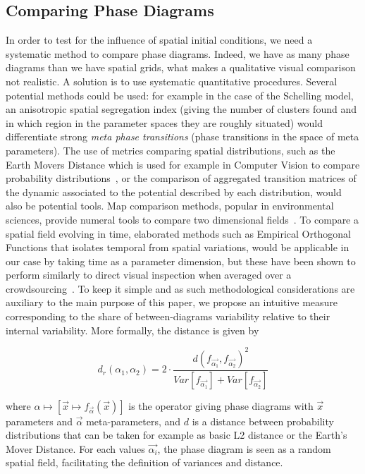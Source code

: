 \documentclass[Afour,sageh,times]{sagej}
\begin{document}


\subsection{Comparing Phase Diagrams}

In order to test for the influence of spatial initial conditions, we need a systematic method to compare phase diagrams. Indeed, we have as many phase diagrams than we have spatial grids, what makes a qualitative visual comparison not realistic. A solution is to use systematic quantitative procedures. Several potential methods could be used: for example in the case of the Schelling model, an anisotropic spatial segregation index (giving the number of clusters found and in which region in the parameter spaces they are roughly situated) would differentiate strong \emph{meta phase transitions} (phase transitions in the space of meta parameters). The use of metrics comparing spatial distributions, such as the Earth Movers Distance which is used for example in Computer Vision to compare probability distributions~\cite{rubner2000earth}, or the comparison of aggregated transition matrices of the dynamic associated to the potential described by each distribution, would also be potential tools. Map comparison methods, popular in environmental sciences, provide numeral tools to compare two dimensional fields~\cite{visser2006map}. To compare a spatial field evolving in time, elaborated methods such as Empirical Orthogonal Functions that isolates temporal from spatial variations, would be applicable in our case by taking time as a parameter dimension, but these have been shown to perform similarly to direct visual inspection when averaged over a crowdsourcing~\cite{10.1371/journal.pone.0178165}. To keep it simple and as such methodological considerations are auxiliary to the main purpose of this paper, we propose an intuitive measure corresponding to the share of between-diagrams variability relative to their internal variability. More formally, the distance is given by

\begin{equation}\label{eq:phase-distance}
d_r\left(\alpha_1,\alpha_2\right) = 2 \cdot \frac{d(f_{\vec{\alpha_1}},f_{\vec{\alpha_2}})^2}{Var\left[f_{\vec{\alpha_1}}\right] + Var\left[f_{\vec{\alpha_2}}\right]}
\end{equation}

where $\alpha \mapsto \left[\vec{x} \mapsto f_{\vec{\alpha}}\left(\vec{x}\right)\right]$ is the operator giving phase diagrams with $\vec{x}$ parameters and $\vec{\alpha}$ meta-parameters, and $d$ is a distance between probability distributions that can be taken for example as basic L2 distance or the Earth's Mover Distance. For each values $\vec{\alpha_i}$, the phase diagram is seen as a random spatial field, facilitating the definition of variances and distance.
\end{document}
